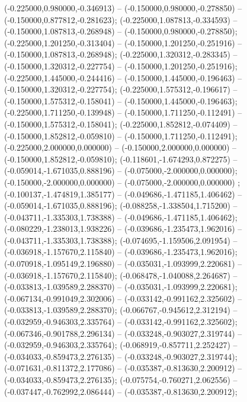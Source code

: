  (-0.225000,0.980000,-0.346913) -- (-0.150000,0.980000,-0.278850) -- (-0.150000,0.877812,-0.281623);
 (-0.225000,1.087813,-0.334593) -- (-0.150000,1.087813,-0.268948) -- (-0.150000,0.980000,-0.278850);
 (-0.225000,1.201250,-0.313404) -- (-0.150000,1.201250,-0.251916) -- (-0.150000,1.087813,-0.268948);
 (-0.225000,1.320312,-0.283345) -- (-0.150000,1.320312,-0.227754) -- (-0.150000,1.201250,-0.251916);
 (-0.225000,1.445000,-0.244416) -- (-0.150000,1.445000,-0.196463) -- (-0.150000,1.320312,-0.227754);
 (-0.225000,1.575312,-0.196617) -- (-0.150000,1.575312,-0.158041) -- (-0.150000,1.445000,-0.196463);
 (-0.225000,1.711250,-0.139948) -- (-0.150000,1.711250,-0.112491) -- (-0.150000,1.575312,-0.158041);
 (-0.225000,1.852812,-0.074409) -- (-0.150000,1.852812,-0.059810) -- (-0.150000,1.711250,-0.112491);
 (-0.225000,2.000000,0.000000) -- (-0.150000,2.000000,0.000000) -- (-0.150000,1.852812,-0.059810);
 (-0.118601,-1.674293,0.872275) -- (-0.059014,-1.671035,0.888196) -- (-0.075000,-2.000000,0.000000);
 (-0.150000,-2.000000,0.000000) -- (-0.075000,-2.000000,0.000000) ;
 (-0.100137,-1.474819,1.385177) -- (-0.049686,-1.471185,1.406462) -- (-0.059014,-1.671035,0.888196);
 (-0.088258,-1.338504,1.715200) -- (-0.043711,-1.335303,1.738388) -- (-0.049686,-1.471185,1.406462);
 (-0.080229,-1.238013,1.938226) -- (-0.039686,-1.235473,1.962016) -- (-0.043711,-1.335303,1.738388);
 (-0.074695,-1.159506,2.091954) -- (-0.036918,-1.157670,2.115840) -- (-0.039686,-1.235473,1.962016);
 (-0.070918,-1.095149,2.196880) -- (-0.035031,-1.093999,2.220681) -- (-0.036918,-1.157670,2.115840);
 (-0.068478,-1.040088,2.264687) -- (-0.033813,-1.039589,2.288370) -- (-0.035031,-1.093999,2.220681);
 (-0.067134,-0.991049,2.302006) -- (-0.033142,-0.991162,2.325602) -- (-0.033813,-1.039589,2.288370);
 (-0.066767,-0.945612,2.312194) -- (-0.032959,-0.946303,2.335764) -- (-0.033142,-0.991162,2.325602);
 (-0.067346,-0.901788,2.296134) -- (-0.033248,-0.903027,2.319744) -- (-0.032959,-0.946303,2.335764);
 (-0.068919,-0.857711,2.252427) -- (-0.034033,-0.859473,2.276135) -- (-0.033248,-0.903027,2.319744);
 (-0.071631,-0.811372,2.177086) -- (-0.035387,-0.813630,2.200912) -- (-0.034033,-0.859473,2.276135);
 (-0.075754,-0.760271,2.062556) -- (-0.037447,-0.762992,2.086444) -- (-0.035387,-0.813630,2.200912);
